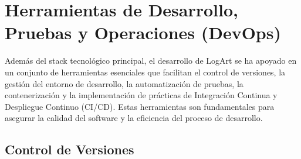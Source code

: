 \section{Herramientas de Desarrollo, Pruebas y Operaciones (DevOps)}
\label{sec:herramientasDevOps}

Además del stack tecnológico principal, el desarrollo de LogArt se ha apoyado en un conjunto de herramientas esenciales que facilitan el control de versiones, la gestión del entorno de desarrollo, la automatización de pruebas, la contenerización y la implementación de prácticas de Integración Continua y Despliegue Continuo (CI/CD). Estas herramientas son fundamentales para asegurar la calidad del software y la eficiencia del proceso de desarrollo.

\subsection{Control de Versiones}
\label{sec:controlVersiones}

